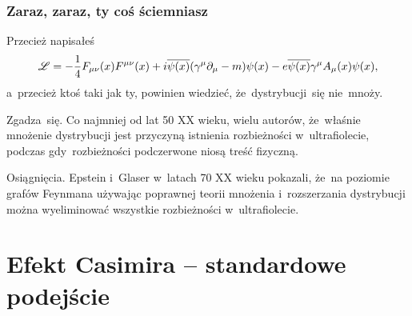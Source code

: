 \documentclass[10pt,t]{beamer}
\begin{document}
\begin{frame}
  \frametitle{Zaraz, zaraz, ty coś ściemniasz}


  Przecież napisałeś
  \begin{equation}
    \label{eq:O-roznych-02}
    \mathcal{L} =
    -\frac{ 1 }{ 4 } F_{ \mu \nu }( x ) F^{ \mu \nu }( x )
    + i \overline{\psi( x )} ( \gamma^{ \mu } \partial_{ \mu } - m ) \psi( x )
    - e \overline{\psi( x )} \gamma^{ \mu } A_{ \mu }( x ) \psi( x ),
  \end{equation}
  a~przecież ktoś taki jak ty, powinien wiedzieć, że~dystrybucji~się
  nie~mnoży.

  Zgadza~się.
  Co najmniej od lat 50 XX wieku, wielu autorów, że~właśnie mnożenie
  dystrybucji jest przyczyną istnienia rozbieżności w~ultrafiolecie,
  podczas gdy~rozbieżności podczerwone niosą treść fizyczną.

  Osiągnięcia.
  Epstein i~Glaser w~latach 70 XX wieku pokazali, że~na poziomie
  grafów Feynmana używając poprawnej teorii mnożenia i~rozszerzania
  dystrybucji można wyeliminować wszystkie rozbieżności
  w~ultrafiolecie.

\end{frame}










\section{Efekt Casimira -- standardowe podejście}
\end{document}
